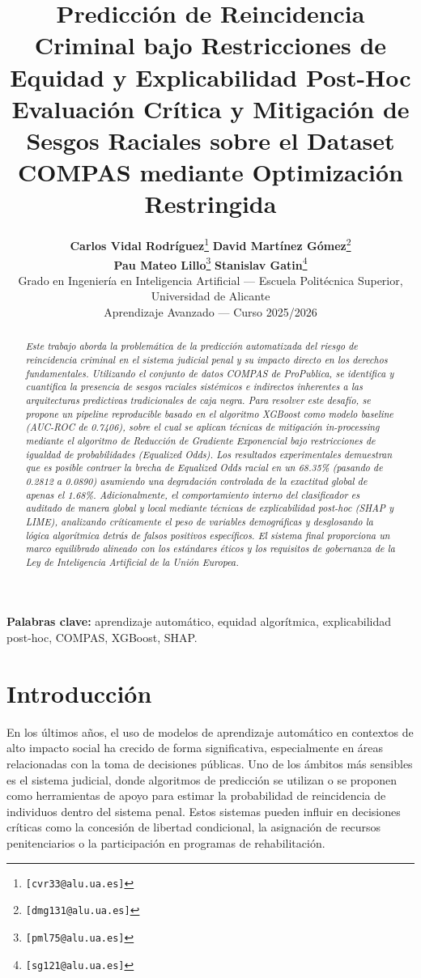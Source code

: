 \documentclass[11pt,a4paper]{article}
\title{
    \textbf{Predicción de Reincidencia Criminal bajo Restricciones de Equidad y Explicabilidad Post-Hoc}\\[4pt]
    \large Evaluación Crítica y Mitigación de Sesgos Raciales sobre el Dataset COMPAS mediante Optimización Restringida
}
\author{
    \textbf{Carlos Vidal Rodríguez}\thanks{\texttt{[cvr33@alu.ua.es]}}
    \qquad
    \textbf{David Martínez Gómez}\thanks{\texttt{[dmg131@alu.ua.es]}}
    \\[10pt]
    \textbf{Pau Mateo Lillo}\thanks{\texttt{[pml75@alu.ua.es]}}
    \qquad
    \textbf{Stanislav Gatin}\thanks{\texttt{[sg121@alu.ua.es]}}
    \\[16pt]
    \small Grado en Ingeniería en Inteligencia Artificial
    --- Escuela Politécnica Superior, Universidad de Alicante\\
    \small Aprendizaje Avanzado --- Curso 2025/2026
}
\date{}
\begin{document}
\maketitle
\thispagestyle{empty}


\begin{abstract}
\textit{Este trabajo aborda la problemática de la predicción automatizada del riesgo de reincidencia criminal en el sistema judicial penal y su impacto directo en los derechos fundamentales. Utilizando el conjunto de datos COMPAS de ProPublica, se identifica y cuantifica la presencia de sesgos raciales sistémicos e indirectos inherentes a las arquitecturas predictivas tradicionales de caja negra. Para resolver este desafío, se propone un pipeline reproducible basado en el algoritmo XGBoost como modelo baseline (AUC-ROC de 0.7406), sobre el cual se aplican técnicas de mitigación in-processing mediante el algoritmo de Reducción de Gradiente Exponencial bajo restricciones de igualdad de probabilidades (Equalized Odds). Los resultados experimentales demuestran que es posible contraer la brecha de Equalized Odds racial en un 68.35\% (pasando de 0.2812 a 0.0890) asumiendo una degradación controlada de la exactitud global de apenas el 1.68\%. Adicionalmente, el comportamiento interno del clasificador es auditado de manera global y local mediante técnicas de explicabilidad post-hoc (SHAP y LIME), analizando críticamente el peso de variables demográficas y desglosando la lógica algorítmica detrás de falsos positivos específicos. El sistema final proporciona un marco equilibrado alineado con los estándares éticos y los requisitos de gobernanza de la Ley de Inteligencia Artificial de la Unión Europea.}
\end{abstract}

\smallskip
\noindent\textbf{Palabras clave:} aprendizaje automático, equidad algorítmica, explicabilidad post-hoc, COMPAS, XGBoost, SHAP.
\tableofcontents
\newpage


\section{Introducción}

En los últimos años, el uso de modelos de aprendizaje automático en contextos de alto impacto social ha crecido de forma significativa, especialmente en áreas relacionadas con la toma de decisiones públicas. Uno de los ámbitos más sensibles es el sistema judicial, donde algoritmos de predicción se utilizan o se proponen como herramientas de apoyo para estimar la probabilidad de reincidencia de individuos dentro del sistema penal. Estos sistemas pueden influir en decisiones críticas como la concesión de libertad condicional, la asignación de recursos penitenciarios o la participación en programas de rehabilitación.
\end{document}
